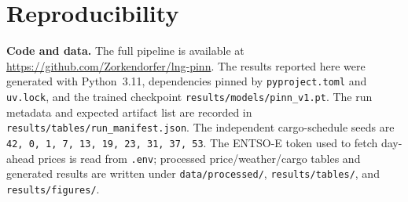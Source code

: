 \documentclass[11pt]{article}
\begin{document}
\section{Reproducibility}
\label{sec:repro}

\textbf{Code and data.} The full pipeline is available at
\url{https://github.com/Zorkendorfer/lng-pinn}. The results reported here were
generated with Python~3.11, dependencies pinned by \texttt{pyproject.toml} and
\texttt{uv.lock}, and the trained checkpoint \texttt{results/models/pinn\_v1.pt}.
The run metadata and expected artifact list are recorded in
\texttt{results/tables/run\_manifest.json}. The independent cargo-schedule seeds
are \texttt{42, 0, 1, 7, 13, 19, 23, 31, 37, 53}. The ENTSO-E token used to fetch
day-ahead prices is read from \texttt{.env}; processed price/weather/cargo tables
and generated results are written under \texttt{data/processed/},
\texttt{results/tables/}, and \texttt{results/figures/}.
\end{document}
